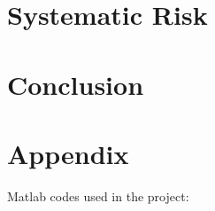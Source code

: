 \documentclass[a4paper, 11pt]{article}
\newcommand{\includecode}[1]{}
\begin{document}
\section{Systematic Risk}


\section{Conclusion}




%
%

\section{Appendix}
Matlab codes used in the project:
\includecode{Q1.m}
\includecode{GeometricBrownianMotion.m}
\includecode{CallValue.m}
\includecode{CallPricingByMonteCarlo.m}
\includecode{Q2.m}
\includecode{getHestonSimulation.m}
\includecode{HestonCallPricingByMonteCarlo.m}
\includecode{getImpliedVolatility.m}
\includecode{DownAndOutOptionValue.m}
\includecode{DownAndOutOptionPricingByMonteCarlo.m}
\includecode{DownAndOutOptionPricingBySolvingPDE.m}
\includecode{Q3.m}
\includecode{CompoundPoissonGenerator.m}
\includecode{getU.m}
\includecode{ruinProbSimulation.m}
\includecode{getTau.m}
\includecode{getNewU.m}
\includecode{ComputeETTau.m}
\includecode{isRuined.m}
\includecode{notRuined.m}
\includecode{SystemRiskModel.m}
\includecode{getDefaultTime.m}
\includecode{DefaultTimeDiffSummary.m}
\includecode{getNumofDefault.m}
\includecode{saveTightFigure.m}
\includecode{LSummary.m}
\end{document}
